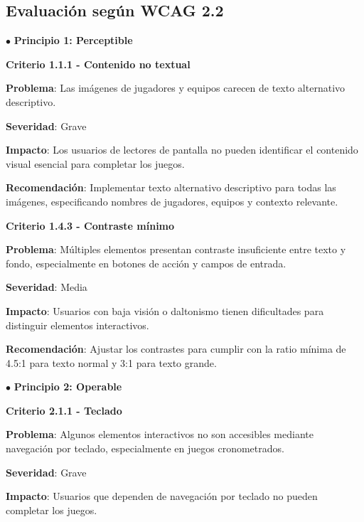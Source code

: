 \documentclass{article}
\begin{document}
	\subsection{Evaluación según WCAG 2.2}

	\vspace{0.3cm}
	\noindent
	$\bullet$ \textbf{Principio 1: Perceptible}
	\vspace{0.3cm}
	
	\noindent
	\textbf{Criterio 1.1.1 - Contenido no textual}
	
	\noindent
	\textbf{Problema}: Las imágenes de jugadores y equipos carecen de texto alternativo descriptivo.
	
	\noindent
	\textbf{Severidad}: Grave
	
	\noindent
	\textbf{Impacto}: Los usuarios de lectores de pantalla no pueden identificar el contenido visual esencial para completar los juegos.
	
	\noindent
	\textbf{Recomendación}: Implementar texto alternativo descriptivo para todas las imágenes, especificando nombres de jugadores, equipos y contexto relevante.
	
	\vspace{0.5cm}
	
	\noindent
	\textbf{Criterio 1.4.3 - Contraste mínimo}
	
	\noindent
	\textbf{Problema}: Múltiples elementos presentan contraste insuficiente entre texto y fondo, especialmente en botones de acción y campos de entrada.
	
	\noindent
	\textbf{Severidad}: Media
	
	\noindent
	\textbf{Impacto}: Usuarios con baja visión o daltonismo tienen dificultades para distinguir elementos interactivos.
	
	\noindent
	\textbf{Recomendación}: Ajustar los contrastes para cumplir con la ratio mínima de 4.5:1 para texto normal y 3:1 para texto grande.

	\vspace{0.3cm}
	\noindent
	$\bullet$ \textbf{Principio 2: Operable}
	\vspace{0.3cm}
	
	\noindent
	\textbf{Criterio 2.1.1 - Teclado}
	
	\noindent
	\textbf{Problema}: Algunos elementos interactivos no son accesibles mediante navegación por teclado, especialmente en juegos cronometrados.
	
	\noindent
	\textbf{Severidad}: Grave
	
	\noindent
	\textbf{Impacto}: Usuarios que dependen de navegación por teclado no pueden completar los juegos.
	
\end{document}
